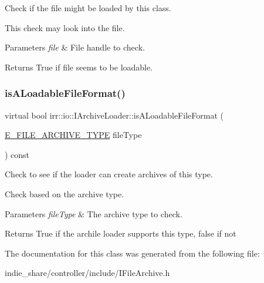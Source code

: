 Check if the file might be loaded by this class. 

This check may look into the file. 
\begin{DoxyParams}{Parameters}
{\em file} & File handle to check. \\
\hline
\end{DoxyParams}
\begin{DoxyReturn}{Returns}
True if file seems to be loadable. 
\end{DoxyReturn}
\mbox{\label{classirr_1_1io_1_1IArchiveLoader_af60c081f27ab941702a4a32dfe482c05}} 
\subsubsection{\texorpdfstring{is\+A\+Loadable\+File\+Format()}{isALoadableFileFormat()}\hspace{0.1cm}{\footnotesize\ttfamily [3/3]}}
{\footnotesize\ttfamily virtual bool irr\+::io\+::\+I\+Archive\+Loader\+::is\+A\+Loadable\+File\+Format (\begin{DoxyParamCaption}\item[{\hyperlink{namespaceirr_1_1io_adb3e3c445ec8e608ed1f0f93306da14f}{E\+\_\+\+F\+I\+L\+E\+\_\+\+A\+R\+C\+H\+I\+V\+E\+\_\+\+T\+Y\+PE}}]{file\+Type }\end{DoxyParamCaption}) const\hspace{0.3cm}{\ttfamily [pure virtual]}}



Check to see if the loader can create archives of this type. 

Check based on the archive type. 
\begin{DoxyParams}{Parameters}
{\em file\+Type} & The archive type to check. \\
\hline
\end{DoxyParams}
\begin{DoxyReturn}{Returns}
True if the archile loader supports this type, false if not 
\end{DoxyReturn}


The documentation for this class was generated from the following file\+:\begin{DoxyCompactItemize}
\item 
indie\+\_\+share/controller/include/I\+File\+Archive.\+h\end{DoxyCompactItemize}
